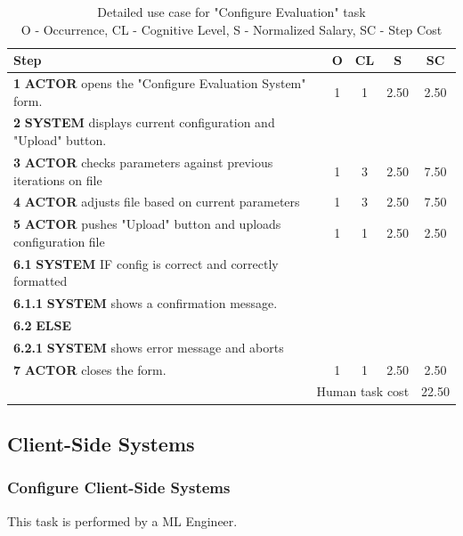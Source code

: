 \begin{table}[H]
\centering
\begin{tabularx}{\textwidth}{|X|c|c|c|c|}
\hline
\textbf{Step} & \textbf{O} & \textbf{CL} & \textbf{S} & \textbf{SC} \\
\hline
\textbf{1} \textbf{ACTOR} opens the "Configure Evaluation System" form. & 1 & 1 & 2.50 & 2.50 \\
\hline
\textbf{2} \textbf{SYSTEM} displays current configuration and "Upload" button. & & & & \\
\hline
\textbf{3} \textbf{ACTOR} checks parameters against previous iterations on file & 1 & 3 & 2.50 & 7.50 \\
\hline
\textbf{4} \textbf{ACTOR} adjusts file based on current parameters & 1 & 3 & 2.50 & 7.50 \\
\hline
\textbf{5} \textbf{ACTOR} pushes "Upload" button and uploads configuration file & 1 & 1 & 2.50 & 2.50 \\
\hline
\textbf{6.1} \textbf{SYSTEM} IF config is correct and correctly formatted & & & & \\
\hline
\textbf{6.1.1} \textbf{SYSTEM} shows a confirmation message. & & & & \\
\hline
\textbf{6.2} \textbf{ELSE} & & & & \\
\hline
\textbf{6.2.1} \textbf{SYSTEM} shows error message and aborts & & & & \\
\hline
\textbf{7} \textbf{ACTOR} closes the form. & 1 & 1 & 2.50 & 2.50 \\
\hline
\multicolumn{4}{|r|}{Human task cost} & 22.50 \\
\hline
\end{tabularx}
\caption{Detailed use case for "Configure Evaluation" task\\ 
O - Occurrence, CL - Cognitive Level, S - Normalized Salary, SC - Step Cost}
\label{table:configure_evaluation_system}
\end{table}

\subsection{ Client-Side Systems}

\subsubsection{Configure Client-Side Systems}

This task is performed by a ML Engineer.

